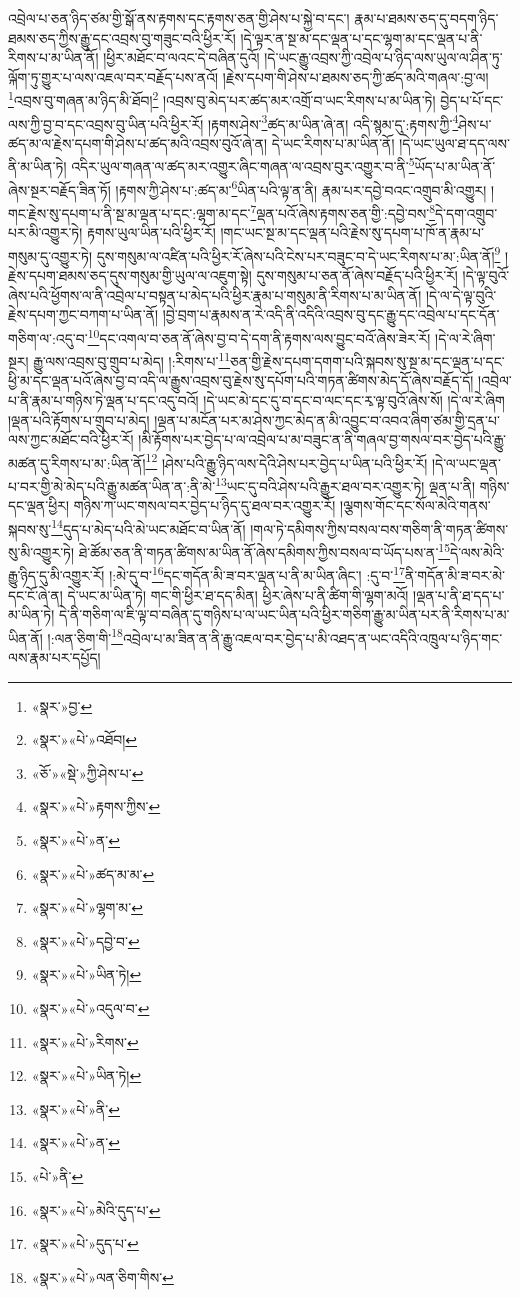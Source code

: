འབྲེལ་པ་ཅན་ཉིད་ཙམ་གྱི་སྒོ་ནས་རྟགས་དང་རྟགས་ཅན་གྱི་ཤེས་པ་སྐྱེ་བ་དང་། རྣམ་པ་ཐམས་ཅད་དུ་བདག་ཉིད་ཐམས་ཅད་ཀྱིས་རྒྱུ་དང་འབྲས་བུ་གཟུང་བའི་ཕྱིར་རོ། །དེ་ལྟར་ན་སྔ་མ་དང་ལྡན་པ་དང་ལྷག་མ་དང་ལྡན་པ་ནི་རིགས་པ་མ་ཡིན་ནོ། །ཕྱིར་མཐོང་བ་ལའང་དེ་བཞིན་དུའོ། །དེ་ཡང་རྒྱུ་འབྲས་ཀྱི་འབྲེལ་པ་ཉིད་ལས་ཡུལ་ལ་ཤིན་ཏུ་ལྐོག་ཏུ་གྱུར་པ་ལས་འཇལ་བར་བརྗོད་པས་ནའོ། །རྗེས་དཔག་གི་ཤེས་པ་ཐམས་ཅད་ཀྱི་ཚད་མའི་གཞལ་:བྱ་ལ། \footnote{«སྣར་»བྱ་}འབྲས་བུ་གཞན་མ་ཉིད་མི་ཐོབ།\footnote{«སྣར་»«པེ་»འཐོབ།} །འབྲས་བུ་མེད་པར་ཚད་མར་འགྲོ་བ་ཡང་རིགས་པ་མ་ཡིན་ཏེ། བྱེད་པ་པོ་དང་ལས་ཀྱི་བྱ་བ་དང་འབྲས་བུ་ཡིན་པའི་ཕྱིར་རོ། །རྟགས་ཤེས་\footnote{«ཅོ་»«སྡེ་»ཀྱི་ཤེས་པ་}ཚད་མ་ཡིན་ཞེ་ན། འདི་སྙམ་དུ་:རྟགས་ཀྱི་\footnote{«སྣར་»«པེ་»རྟགས་ཀྱིས་}ཤེས་པ་ཚད་མ་ལ་རྗེས་དཔག་གི་ཤེས་པ་ཚད་མའི་འབྲས་བུའོ་ཞེ་ན། དེ་ཡང་རིགས་པ་མ་ཡིན་ནོ། །དེ་ཡང་ཡུལ་ཐ་དད་ལས་ནི་མ་ཡིན་ཏེ། འདིར་ཡུལ་གཞན་ལ་ཚད་མར་འགྱུར་ཞིང་གཞན་ལ་འབྲས་བུར་འགྱུར་བ་ནི་\footnote{«སྣར་»«པེ་»ན་}ཡོད་པ་མ་ཡིན་ནོ་ཞེས་སྔར་བརྗོད་ཟིན་ཏོ། །རྟགས་ཀྱི་ཤེས་པ་:ཚད་མ་\footnote{«སྣར་»«པེ་»ཚད་མ་མ་}ཡིན་པའི་ལྟ་ན་ནི། རྣམ་པར་དབྱེ་བའང་འགྲུབ་མི་འགྱུར། །གང་རྗེས་སུ་དཔག་པ་ནི་སྔ་མ་ལྡན་པ་དང་:ལྷག་མ་དང་\footnote{«སྣར་»«པེ་»ལྷག་མ་}ལྡན་པའོ་ཞེས་རྟགས་ཅན་གྱི་:དབྱེ་བས་\footnote{«སྣར་»«པེ་»དབྱེ་བ་}དེ་དག་འགྲུབ་པར་མི་འགྱུར་ཏེ། རྟགས་ཡུལ་ཡིན་པའི་ཕྱིར་རོ། །གང་ཡང་སྔ་མ་དང་ལྡན་པའི་རྗེས་སུ་དཔག་པ་ཁོ་ན་རྣམ་པ་གསུམ་དུ་འགྱུར་ཏེ། དུས་གསུམ་ལ་འཛིན་པའི་ཕྱིར་རོ་ཞེས་པའི་ངེས་པར་བཟུང་བ་དེ་ཡང་རིགས་པ་མ་:ཡིན་ནོ།\footnote{«སྣར་»«པེ་»ཡིན་ཏེ།} །རྗེས་དཔག་ཐམས་ཅད་དུས་གསུམ་གྱི་ཡུལ་ལ་འཇུག་སྟེ། དུས་གསུམ་པ་ཅན་ནོ་ཞེས་བརྗོད་པའི་ཕྱིར་རོ། །དེ་ལྟ་བུའོ་ཞེས་པའི་ཕྱོགས་ལ་ནི་འབྲེལ་པ་བསྟན་པ་མེད་པའི་ཕྱིར་རྣམ་པ་གསུམ་ནི་རིགས་པ་མ་ཡིན་ནོ། །དེ་ལ་དེ་ལྟ་བུའི་རྗེས་དཔག་ཀྱང་བཀག་པ་ཡིན་ནོ། །བྱེ་བྲག་པ་རྣམས་ན་རེ་འདི་ནི་འདིའི་འབྲས་བུ་དང་རྒྱུ་དང་འབྲེལ་པ་དང་དོན་གཅིག་ལ་:འདུ་བ་\footnote{«སྣར་»«པེ་»འདུལ་བ་}དང་འགལ་བ་ཅན་ནོ་ཞེས་བྱ་བ་དེ་དག་ནི་རྟགས་ལས་བྱུང་བའོ་ཞེས་ཟེར་རོ། །དེ་ལ་རེ་ཞིག་སྔར། རྒྱུ་ལས་འབྲས་བུ་གྲུབ་པ་མེད། །:རིགས་པ་\footnote{«སྣར་»«པེ་»རིགས་}ཅན་གྱི་རྗེས་དཔག་དགག་པའི་སྐབས་སུ་སྔ་མ་དང་ལྡན་པ་དང་ཕྱི་མ་དང་ལྡན་པའོ་ཞེས་བྱ་བ་འདི་ལ་རྒྱུས་འབྲས་བུ་རྗེས་སུ་དཔོག་པའི་གཏན་ཚིགས་མེད་དོ་ཞེས་བརྗོད་དོ། །འབྲེལ་པ་ནི་རྣམ་པ་གཉིས་ཏེ་ལྡན་པ་དང་འདུ་བའོ། །དེ་ཡང་མེ་དང་དུ་བ་དང་བ་ལང་དང་རྭ་ལྟ་བུའོ་ཞེས་སོ། །དེ་ལ་རེ་ཞིག །ལྡན་པའི་རྟོགས་པ་གྲུབ་པ་མེད། །ལྡན་པ་མངོན་པར་མ་ཤེས་ཀྱང་མེད་ན་མི་འབྱུང་བ་འབའ་ཞིག་ཙམ་གྱི་དྲན་པ་ལས་ཀྱང་མཐོང་བའི་ཕྱིར་རོ། །མི་རྟོགས་པར་བྱེད་པ་ལ་འབྲེལ་པ་མ་བཟུང་ན་ནི་གཞལ་བྱ་གསལ་བར་བྱེད་པའི་རྒྱུ་མཚན་དུ་རིགས་པ་མ་:ཡིན་ནོ།\footnote{«སྣར་»«པེ་»ཡིན་ཏེ།} །ཤེས་པའི་རྒྱུ་ཉིད་ལས་དེའི་ཤེས་པར་བྱེད་པ་ཡིན་པའི་ཕྱིར་རོ། །དེ་ལ་ཡང་ལྡན་པ་བར་གྱི་མེ་མེད་པའི་རྒྱུ་མཚན་ཡིན་ན་:ནི་མེ་\footnote{«སྣར་»«པེ་»ནི་}ཡང་དུ་བའི་ཤེས་པའི་རྒྱུར་ཐལ་བར་འགྱུར་ཏེ། ལྡན་པ་ནི། གཉིས་དང་ལྡན་ཕྱིར། གཉིས་ཀ་ཡང་གསལ་བར་བྱེད་པ་ཉིད་དུ་ཐལ་བར་འགྱུར་རོ། །ལྕགས་གོང་དང་སོལ་མེའི་གནས་སྐབས་སུ་\footnote{«སྣར་»«པེ་»ན་}དུད་པ་མེད་པའི་མེ་ཡང་མཐོང་བ་ཡིན་ནོ། །གལ་ཏེ་དམིགས་ཀྱིས་བསལ་བས་གཅིག་ནི་གཏན་ཚིགས་སུ་མི་འགྱུར་ཏེ། ཐེ་ཚོམ་ཅན་ནི་གཏན་ཚིགས་མ་ཡིན་ནོ་ཞེས་དམིགས་ཀྱིས་བསལ་བ་ཡོད་པས་ན་\footnote{«པེ་»ནི་}དེ་ལས་མེའི་རྒྱུ་ཉིད་དུ་མི་འགྱུར་རོ། །:མེ་དུ་བ་\footnote{«སྣར་»«པེ་»མེའི་དུད་པ་}དང་གདོན་མི་ཟ་བར་ལྡན་པ་ནི་མ་ཡིན་ཞིང་། :དུ་བ་\footnote{«སྣར་»«པེ་»དུད་པ་}ནི་གདོན་མི་ཟ་བར་མེ་དང་ངོ་ཞེ་ན། དེ་ཡང་མ་ཡིན་ཏེ། གང་གི་ཕྱིར་ཐ་དད་མིན། ཕྱིར་ཞེས་པ་ནི་ཚིག་གི་ལྷག་མའོ། །ལྡན་པ་ནི་ཐ་དད་པ་མ་ཡིན་ཏེ། དེ་ནི་གཅིག་ལ་ཇི་ལྟ་བ་བཞིན་དུ་གཉིས་པ་ལ་ཡང་ཡིན་པའི་ཕྱིར་གཅིག་རྒྱུ་མ་ཡིན་པར་ནི་རིགས་པ་མ་ཡིན་ནོ། །:ལན་ཅིག་གི་\footnote{«སྣར་»«པེ་»ལན་ཅིག་གིས་}འབྲེལ་པ་མ་ཟིན་ན་ནི་རྒྱུ་འཇལ་བར་བྱེད་པ་མི་འཐད་ན་ཡང་འདིའི་འཁྲུལ་པ་ཉིད་གང་ལས་རྣམ་པར་དཔྱོད། 